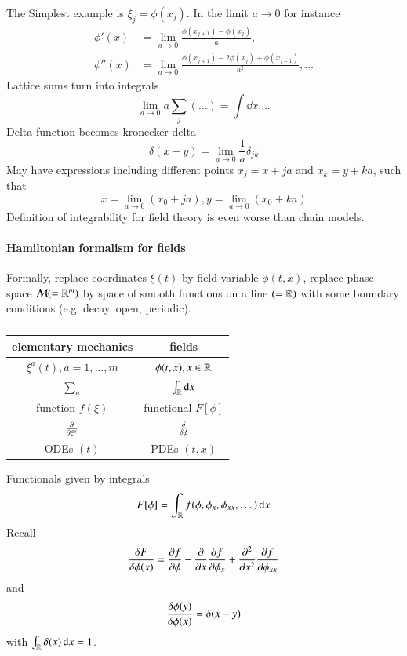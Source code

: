 The Simplest example is $\xi_j = \phi(x_j)$. In the limit $a\rightarrow 0$ for instance 
\begin{align*}
	\phi'(x) &= \lim_{a\rightarrow 0} \frac{\phi(x_{j+1}) - \phi(x_j)}{a}, \\
	\phi''(x) &= \lim_{a\rightarrow 0} \frac{\phi(x_{j+1}) - 2 \phi(x_j) + \phi(x_{j-1})}{a^2}, \dots
\end{align*}
Lattice sums turn into integrals
\begin{equation*}
	\lim_{a\rightarrow 0} a \sum_j (\dots) = \int \dd{x} \dots .
\end{equation*}
Delta function becomes kronecker delta
\begin{equation*}
	\delta(x-y) = \lim_{a\rightarrow 0} \frac{1}{a} \delta_{jk}
\end{equation*}
May have expressions including different points $x_j = x+ja$ and $x_k = y+ka$, such that 
\begin{equation*}
	x = \lim_{a\rightarrow 0} (x_0 + ja), y = \lim_{a\rightarrow 0} (x_0 + ka)
\end{equation*}
Definition of integrability for field theory is even worse than chain models.



\paragraph{Hamiltonian formalism for fields}
Formally, replace coordinates $\xi (t)$ by field variable $\phi(t, x)$, replace phase space $\mathcal{M}(=\mathbb{R}^m)$ by space of smooth functions on a line $(=\mathbb{R})$ with some boundary conditions (e.g. decay, open, periodic). 
\begin{table}[htpb]
	\centering
	\begin{tabular}{cc}
		\toprule
		elementary mechanics & fields \\
		\midrule
		$\xi^a(t), a = 1, \dots, m$ & $\phi(t, x), x\in \mathbb{R}$ \\
		$\sum_a$ & $\int_{\mathbb{R}}\dd{x}$ \\
		function $f(\xi)$ & functional $F[\phi]$ \\
		$\pdv{\xi^a}$ & $\fdv{\phi}$ \\
		ODEs $(t)$ & PDEs $(t, x)$ \\
		\bottomrule
	\end{tabular}
	\caption{}
\end{table}

Functionals given by integrals
\begin{equation*}
	F[\phi] = \int_{\mathbb{R}} f(\phi, \phi_x, \phi_{x x }, \dots) \dd{x}
\end{equation*}
Recall 
\begin{equation*}
	\fdv{F}{\phi(x)} = \pdv{f}{\phi} - \pdv{x} \pdv{f}{\phi_x} + \pdv[2]{x} \pdv{f}{\phi_{x x}}
\end{equation*}
and 
\begin{equation*}
	\fdv{\phi(y)}{\phi(x)} = \delta(x-y)
\end{equation*}
with $\int_{\mathbb{R}} \delta(x) \dd{x} = 1$.

